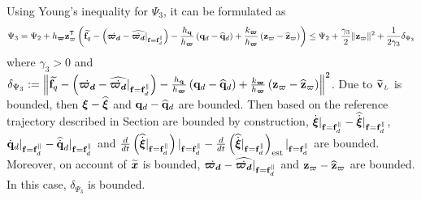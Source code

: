 \documentclass[journal,onecolumn]{IEEEtran}
\begin{document}
Using Young's inequality for $\Psi_3$, it can be formulated as
%
\begin{equation}
	\begin{aligned}
		\Psi_3=\Psi_2 + h_{\bs\varpi}\zc[T]\LP\widetilde{\f_q} - \LP\dot{\bs{\varpi_d}} - \widehat{\dot{\bs{\varpi_d}}}|_{\f=\f_d^{\|}}\RP -  \frac{h_\v{q}}{h_{\bs{\varpi}}}\LP\dird-\qdhat
		\RP + \frac{k_{\bs{\varpi}}}{h_{\bs{\varpi}}}\LP\zc-\zchat\RP\RP
		\leq \Psi_2 + \frac{\gamma_3}{2} \|\zc\|^2 + \frac{1}{2\gamma_3}\delta_{\Psi_3}
	\end{aligned}
\end{equation}
%
where $\gamma_3>0$ and $\delta_{\Psi_3}:=\left\|\widetilde{\f_q} - \LP\dot{\bs{\varpi_d}} - \widehat{\dot{\bs{\varpi_d}}}|_{\f=\f_d^{\|}}\RP -  \frac{h_\v{q}}{h_{\bs{\varpi}}}\LP\dird-\qdhat
\RP + \frac{k_{\bs{\varpi}}}{h_{\bs{\varpi}}}\LP\zc-\zchat\RP\right\|^2$. 
Due to $\vLtilde$ is bounded, then $\Xiq-\widehat{\Xiq}$ and $\dird-\qdhat$ are bounded.
Then based on the reference trajectory described in Section \uppercase\expandafter{} \cite{2024_Yang_TIE} are bounded by construction, $\dot{\Xiq}|_{\f=\fd^{\|}}-\widehat{\dot{\Xiq}}|_{\f=\fd^{\|}}$, $\qddot|_{\f=\f_d^{\|}}-\qddothat|_{\f=\f_d^{\|}}$ and $\frac{d}{dt}\LP\widehat{\dot{\Xiq}}|_{\f=\fd^{\|}}\RP|_{\f=\fd^{\|}}-\frac{d}{dt}\LP\widehat{\dot{\Xiq}}|_{\f=\fd^{\|}}\RP_{\text{est}}|_{\f=\fd^{\|}}$ are bounded. 
Moreover, on account of $\widetilde{\boldsymbol{x}}$ is bounded, $\dot{\bs{\varpi_d}} - \widehat{\dot{\bs{\varpi_d}}}|_{\f=\f_d^{\|}}$ and $\zc-\zchat$ are bounded.
In this case, $\delta_{\Psi_3}$ is bounded.
\end{document}
